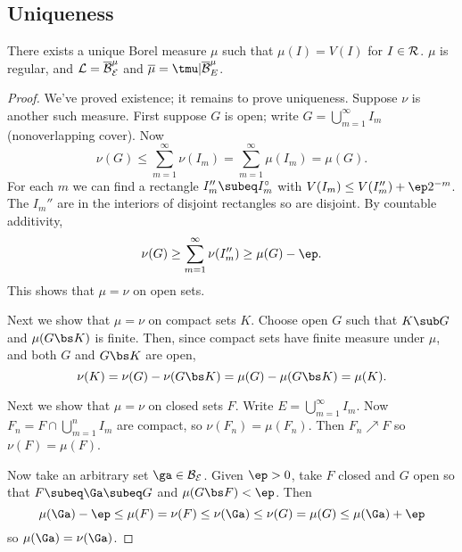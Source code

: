 
\subsection{Uniqueness}
\begin{thm}\label{uniqmeas}
There exists a unique Borel measure $\mu$ such that $\mu(I)=V(I)$ for $I\in \cal R$. $\mu$ is regular, and $\cal L=\overline{\cal B}_E^{\mu}$ and $\overline{\mu}=\tmu|\overline{\cal B}^{\mu}_E$.
\end{thm}
\begin{proof}
We've proved existence; it remains to prove uniqueness.
Suppose $\nu$ is another such measure. First suppose $G$ is open; write $G=\bigcup_{m=1}^{\infty} I_m$ (nonoverlapping cover). %
Now
\[
\nu(G)\leq \sum_{m=1}^{\infty} \nu(I_m)=\sum_{m=1}^{\infty}\mu(I_m)=
\mu(G).
\]
For each $m$ we can find a rectangle $I_m''\subeq I_m^{\circ}$ with $V(I_m)\leq V(I_m'')+\ep2^{-m}$. The $I_m''$ are in the interiors of disjoint rectangles so are disjoint. By countable additivity,
\[
\nu(G)\geq \sum_{m=1}^{\infty}\nu(I_m'')\geq \mu(G)-\ep.
\]
This shows that $\mu=\nu$ on open sets. 

Next we show that $\mu=\nu$ on compact sets $K$. Choose open $G$ such that $K\sub G$ and $\mu(G\bs K)$ is finite. Then, since compact sets have finite measure under $\mu$, and both $G$ and $G\bs K$ are open,
\[
\nu(K)=\nu(G)-\nu(G\bs K)=\mu(G)-\mu(G\bs K)=\mu(K).
\]

Next we show that $\mu=\nu$ on closed sets $F$. Write $E=\bigcup_{m=1}^{\infty} I_m$. Now $F_n=F\cap \bigcup_{m=1}^n I_m$ are compact, so $\nu(F_n)=\mu(F_n)$. Then $F_n\nearrow F$ so $\nu(F)=\mu(F)$.

Now take an arbitrary set $\ga\in \cal B_E$. Given $\ep>0$, take $F$ closed and $G$ open so that $F\subeq \Ga\subeq G$ and $\mu(G\bs F)<\ep$. Then
\[
\mu(\Ga)-\ep\leq \mu(F)=\nu(F)\leq \nu(\Ga)\leq \nu(G)=\mu(G)\leq \mu(\Ga)+\ep
\]
so $\mu(\Ga)=\nu(\Ga)$.

\end{proof}
